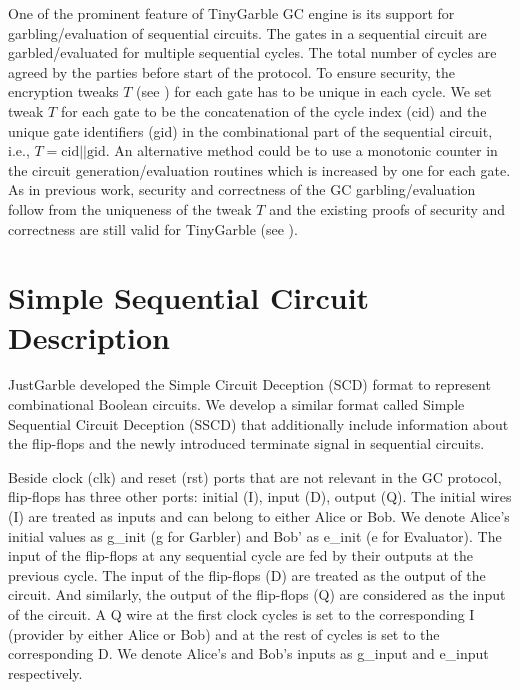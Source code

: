 One of the prominent feature of TinyGarble GC engine is its support for garbling/evaluation of sequential circuits.
The gates in a sequential circuit are garbled/evaluated for multiple sequential cycles.
The total number of cycles are agreed by the parties before start of the protocol.
To ensure security, the encryption tweaks $T$ (see ) for each gate has to be unique in each cycle\cite[Sect. 3.4]{henecka2013faster}.
We set tweak $T$ for each gate to be the concatenation of the cycle index (cid) and the unique gate identifiers (gid) in the combinational part of the sequential circuit, i.e., $T = \textrm{cid} || \textrm{gid}$.
An alternative method could be to use a monotonic counter in the circuit generation/evaluation routines which is increased by one for each gate.
As in previous work, security and correctness of the GC garbling/evaluation follow from the uniqueness of the tweak $T$ and the existing proofs of security and correctness are still valid for TinyGarble (see \cite{lindell2009proof, bellare2013efficient, zahur2015two}).


\section{Simple Sequential Circuit Description}\label{sec:engine-sscd}
JustGarble \cite{bellare2013efficient} developed the Simple Circuit Deception (SCD) format to represent combinational Boolean circuits.
We develop a similar format called Simple Sequential Circuit Deception (SSCD) that additionally include information about the flip-flops and the newly introduced terminate signal in sequential circuits.

Beside clock (clk) and reset (rst) ports that are not relevant in the GC protocol, flip-flops has three other ports: initial (I), input (D), output (Q).
The initial wires (I) are treated as inputs and can belong to either Alice or Bob.
We denote Alice's initial values as g\_init (g for Garbler) and Bob' as e\_init (e for Evaluator).
The input of the flip-flops at any sequential cycle are fed by their outputs at the previous cycle.
The input of the flip-flops (D) are treated  as the output of the circuit.
And similarly, the output of the flip-flops (Q) are considered as the input of the circuit.  
A Q wire at the first clock cycles is set to the corresponding I (provider by either Alice or Bob) and at the rest of cycles is set to the corresponding D.
We denote Alice's and Bob's inputs as g\_input and e\_input respectively.

